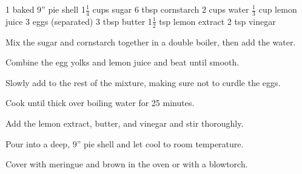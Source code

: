 \dishtype{}
\begin{ingreds}
    1 baked 9'' pie shell
    1$\frac{1}{4}$ cups sugar
    6 tbsp cornstarch
    2 cups water
    $\frac{1}{3}$ cup lemon juice
    3 eggs (separated)
    3 tbsp butter
    1$\frac{1}{2}$ tsp lemon extract
    2 tsp vinegar 
\end{ingreds}
\begin{method}
    Mix the sugar and cornstarch together in a double boiler, then add the water.\par
    Combine the egg yolks and lemon juice and beat until smooth.\par
    Slowly add to the rest of the mixture, making sure not to curdle the eggs.\par
    Cook until thick over boiling water for 25 minutes.\par
    Add the lemon extract, butter, and vinegar and stir thoroughly.\par
    Pour into a deep, 9'' pie shell and let cool to room temperature.\par
    Cover with meringue and brown in the oven or with a blowtorch.
\end{method}